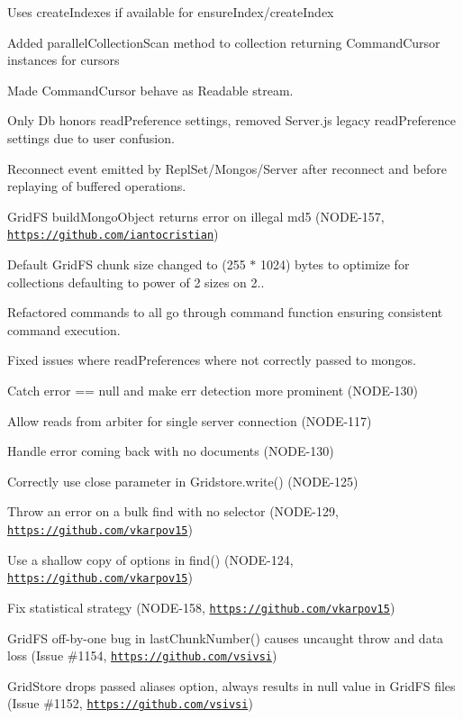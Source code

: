 \begin{DoxyItemize}
\item Uses create\+Indexes if available for ensure\+Index/create\+Index
\item Added parallel\+Collection\+Scan method to collection returning Command\+Cursor instances for cursors
\item Made Command\+Cursor behave as Readable stream.
\item Only Db honors read\+Preference settings, removed Server.\+js legacy read\+Preference settings due to user confusion.
\item Reconnect event emitted by Repl\+Set/\+Mongos/\+Server after reconnect and before replaying of buffered operations.
\item Grid\+FS build\+Mongo\+Object returns error on illegal md5 (N\+O\+D\+E-\/157, \href{https://github.com/iantocristian}{\tt https\+://github.\+com/iantocristian})
\item Default Grid\+FS chunk size changed to (255 $\ast$ 1024) bytes to optimize for collections defaulting to power of 2 sizes on 2..
\item Refactored commands to all go through command function ensuring consistent command execution.
\item Fixed issues where read\+Preferences where not correctly passed to mongos.
\item Catch error == null and make err detection more prominent (N\+O\+D\+E-\/130)
\item Allow reads from arbiter for single server connection (N\+O\+D\+E-\/117)
\item Handle error coming back with no documents (N\+O\+D\+E-\/130)
\item Correctly use close parameter in Gridstore.\+write() (N\+O\+D\+E-\/125)
\item Throw an error on a bulk find with no selector (N\+O\+D\+E-\/129, \href{https://github.com/vkarpov15}{\tt https\+://github.\+com/vkarpov15})
\item Use a shallow copy of options in find() (N\+O\+D\+E-\/124, \href{https://github.com/vkarpov15}{\tt https\+://github.\+com/vkarpov15})
\item Fix statistical strategy (N\+O\+D\+E-\/158, \href{https://github.com/vkarpov15}{\tt https\+://github.\+com/vkarpov15})
\item Grid\+FS off-\/by-\/one bug in last\+Chunk\+Number() causes uncaught throw and data loss (Issue \#1154, \href{https://github.com/vsivsi}{\tt https\+://github.\+com/vsivsi})
\item Grid\+Store drops passed {\ttfamily aliases} option, always results in {\ttfamily null} value in Grid\+FS files (Issue \#1152, \href{https://github.com/vsivsi}{\tt https\+://github.\+com/vsivsi})

\end{DoxyItemize}
